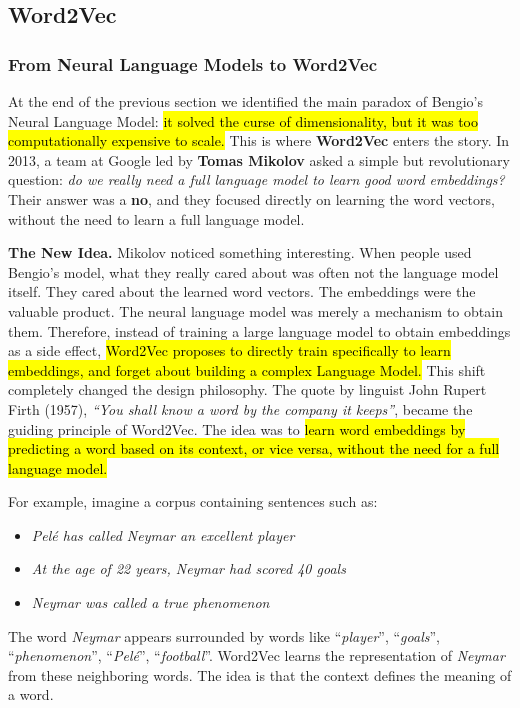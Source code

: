 \subsection{Word2Vec}\label{sec:word2vec}

\subsubsection{From Neural Language Models to Word2Vec}\label{sec:from-neural-language-models-to-word2vec}

At the end of the previous section we identified the main paradox of Bengio's Neural Language Model: \hl{it solved the curse of dimensionality, but it was too computationally expensive to scale.} This is where \textbf{Word2Vec} enters the story.\cite{mikolov2013efficient} In 2013, a team at Google led by \textbf{Tomas Mikolov} asked a simple but revolutionary question: \emph{do we really need a full language model to learn good word embeddings?} Their answer was a \textbf{no}, and they focused directly on learning the word vectors, without the need to learn a full language model.

\highspace
\textcolor{Green3}{ \textbf{The New Idea.}} Mikolov noticed something interesting. When people used Bengio's model, what they really cared about was often not the language model itself. They cared about the learned word vectors. The embeddings were the valuable product. The neural language model was merely a mechanism to obtain them. Therefore, instead of training a large language model to obtain embeddings as a side effect, \hl{Word2Vec proposes to directly train specifically to learn embeddings, and forget about building a complex Language Model.} This shift completely changed the design philosophy. The quote by linguist John Rupert Firth (1957), \emph{``You shall know a word by the company it keeps''}, became the guiding principle of Word2Vec. The idea was to \hl{learn word embeddings by predicting a word based on its context, or vice versa, without the need for a full language model.}

\highspace
For example, imagine a corpus containing sentences such as:
\begin{itemize}
    \item \emph{Pelé has called Neymar an excellent player}
    \item \emph{At the age of 22 years, Neymar had scored 40 goals}
    \item \emph{Neymar was called a true phenomenon}
\end{itemize}
The word \emph{Neymar} appears surrounded by words like ``\emph{player}'', ``\emph{goals}'', ``\emph{phenomenon}'', ``\emph{Pelé}'', ``\emph{football}''. Word2Vec learns the representation of \emph{Neymar} from these neighboring words. The idea is that the context defines the meaning of a word.

